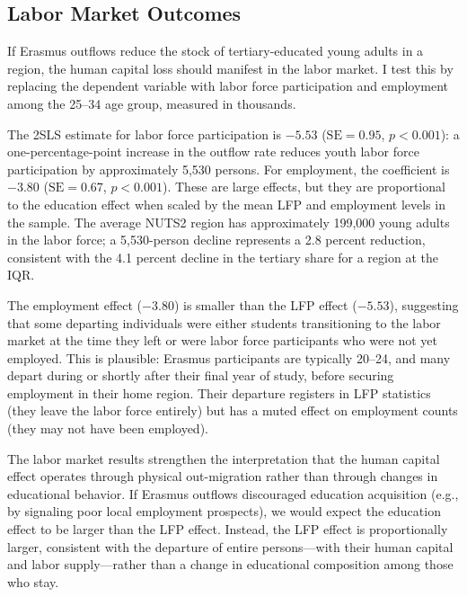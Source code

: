\documentclass[12pt]{article}
\begin{document}
\begin{table}[H]
\centering
\caption{Effect of Erasmus Outflow Rate on Tertiary Education Share (25--34)}
\label{tab:main}

\end{table}

\subsection{Labor Market Outcomes}

If Erasmus outflows reduce the stock of tertiary-educated young adults in a region, the human capital loss should manifest in the labor market. I test this by replacing the dependent variable with labor force participation and employment among the 25--34 age group, measured in thousands.

The 2SLS estimate for labor force participation is $-5.53$ ($\text{SE} = 0.95$, $p < 0.001$): a one-percentage-point increase in the outflow rate reduces youth labor force participation by approximately 5,530 persons. For employment, the coefficient is $-3.80$ ($\text{SE} = 0.67$, $p < 0.001$). These are large effects, but they are proportional to the education effect when scaled by the mean LFP and employment levels in the sample. The average NUTS2 region has approximately 199,000 young adults in the labor force; a 5,530-person decline represents a 2.8 percent reduction, consistent with the 4.1 percent decline in the tertiary share for a region at the IQR.

The employment effect ($-3.80$) is smaller than the LFP effect ($-5.53$), suggesting that some departing individuals were either students transitioning to the labor market at the time they left or were labor force participants who were not yet employed. This is plausible: Erasmus participants are typically 20--24, and many depart during or shortly after their final year of study, before securing employment in their home region. Their departure registers in LFP statistics (they leave the labor force entirely) but has a muted effect on employment counts (they may not have been employed).

The labor market results strengthen the interpretation that the human capital effect operates through physical out-migration rather than through changes in educational behavior. If Erasmus outflows discouraged education acquisition (e.g., by signaling poor local employment prospects), we would expect the education effect to be larger than the LFP effect. Instead, the LFP effect is proportionally larger, consistent with the departure of entire persons---with their human capital and labor supply---rather than a change in educational composition among those who stay.
\end{document}
